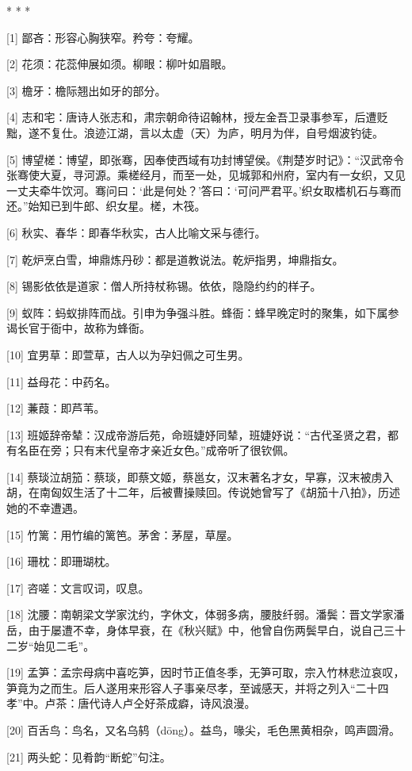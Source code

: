 \documentclass[12pt,UTF8]{ctexbook}
\begin{document}
* * *



[1] 鄙吝：形容心胸狭窄。矜夸：夸耀。

[2] 花须：花蕊伸展如须。柳眼：柳叶如眉眼。

[3] 檐牙：檐际翘出如牙的部分。

[4] 志和宅：唐诗人张志和，肃宗朝命待诏翰林，授左金吾卫录事参军，后遭贬黜，遂不复仕。浪迹江湖，言以太虚（天）为庐，明月为伴，自号烟波钓徒。

[5] 博望槎：博望，即张骞，因奉使西域有功封博望侯。《荆楚岁时记》：“汉武帝令张骞使大夏，寻河源。乘槎经月，而至一处，见城郭和州府，室内有一女织，又见一丈夫牵牛饮河。骞问曰：‘此是何处？’答曰：‘可问严君平。’织女取榰机石与骞而还。”始知已到牛郎、织女星。槎，木筏。

[6] 秋实、春华：即春华秋实，古人比喻文采与德行。

[7] 乾炉烹白雪，坤鼎炼丹砂：都是道教说法。乾炉指男，坤鼎指女。

[8] 锡影依依是道家：僧人所持杖称锡。依依，隐隐约约的样子。

[9] 蚁阵：蚂蚁排阵而战。引申为争强斗胜。蜂衙：蜂早晚定时的聚集，如下属参谒长官于衙中，故称为蜂衙。

[10] 宜男草：即萱草，古人以为孕妇佩之可生男。

[11] 益母花：中药名。

[12] 蒹葭：即芦苇。

[13] 班姬辞帝辇：汉成帝游后苑，命班婕妤同辇，班婕妤说：“古代圣贤之君，都有名臣在旁；只有末代皇帝才亲近女色。”成帝听了很钦佩。

[14] 蔡琰泣胡笳：蔡琰，即蔡文姬，蔡邕女，汉末著名才女，早寡，汉末被虏入胡，在南匈奴生活了十二年，后被曹操赎回。传说她曾写了《胡笳十八拍》，历述她的不幸遭遇。

[15] 竹篱：用竹编的篱笆。茅舍：茅屋，草屋。

[16] 珊枕：即珊瑚枕。

[17] 咨嗟：文言叹词，叹息。

[18] 沈腰：南朝梁文学家沈约，字休文，体弱多病，腰肢纤弱。潘鬓：晋文学家潘岳，由于屡遭不幸，身体早衰，在《秋兴赋》中，他曾自伤两鬓早白，说自己三十二岁“始见二毛”。

[19] 孟笋：孟宗母病中喜吃笋，因时节正值冬季，无笋可取，宗入竹林悲泣哀叹，笋竟为之而生。后人遂用来形容人子事亲尽孝，至诚感天，并将之列入“二十四孝”中。卢茶：唐代诗人卢仝好茶成癖，诗风浪漫。

[20] 百舌鸟：鸟名，又名乌鸫（dōng）。益鸟，喙尖，毛色黑黄相杂，鸣声圆滑。

[21] 两头蛇：见肴韵“断蛇”句注。
\end{document}
